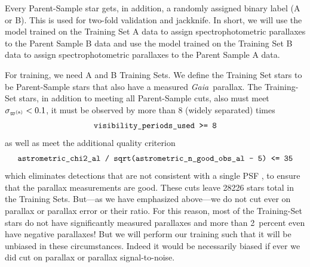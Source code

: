 \documentclass[modern]{aastex62}
\newcommand{\code}[1]{\texttt{\detokenize{#1}}}
\newcommand{\project}[1]{\textsl{#1}}
\newcommand{\gaia}{\project{Gaia}}
\begin{document}
Every Parent-Sample star gets, in addition, a randomly assigned binary
label (A or B).
This is used for two-fold validation and jackknife.
In short, we will
use the model trained on the Training Set A data to assign spectrophotometric parallaxes
to the Parent Sample B data and
use the model trained on the Training Set B data to assign spectrophotometric parallaxes
to the Parent Sample A data.

For training, we need A and B Training Sets.
We define the Training Set stars to be Parent-Sample stars that also
have a measured \gaia\ parallax.
The Training-Set stars, in addition to meeting all Parent-Sample cuts,
also must meet $\sigma_{\varpi^{(\rm a)}} < 0.1$, it must be observed by
more than $8$ (widely separated) times
\begin{equation}
\code{visibility_periods_used >= 8}
\end{equation}
as well as meet the additional quality criterion
\begin{equation}
\code{astrometric_chi2_al / sqrt(astrometric_n_good_obs_al - 5) <= 35}
\end{equation}
which eliminates detections that are not consistent with a single PSF \citep[see][]{calj},
to ensure that the parallax measurements are good.
These cuts leave 28226 stars total in the Training Sets.
But---as we have emphasized above---we do not cut ever on parallax or
parallax error or their ratio. For this reason, most of the Training-Set stars
do not have significantly measured parallaxes and more than 2~percent even have
negative parallaxes!
But we will perform our training such that it will be unbiased in these
circumstances.
Indeed it would be necessarily biased if ever we did cut on parallax or
parallax signal-to-noise.
\end{document}
